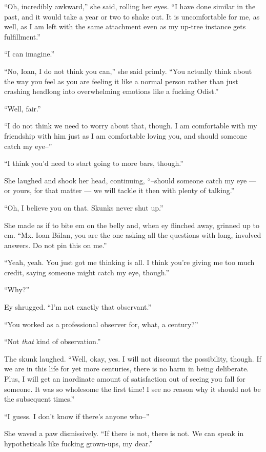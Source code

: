 ``Oh, incredibly awkward,'' she said, rolling her eyes. ``I have done similar in the past, and it would take a year or two to shake out. It is uncomfortable for me, as well, as I am left with the same attachment even as my up-tree instance gets fulfillment.''

``I can imagine.''

``No, Ioan, I do not think you can,'' she said primly. ``You actually think about the way you feel as you are feeling it like a normal person rather than just crashing headlong into overwhelming emotions like a fucking Odist.''

``Well, fair.''

``I do not think we need to worry about that, though. I am comfortable with my friendship with him just as I am comfortable loving you, and should someone catch my eye--''

``I think you'd need to start going to more bars, though.''

She laughed and shook her head, continuing, ``--should someone catch my eye — or yours, for that matter — we will tackle it then with plenty of talking.''

``Oh, I believe you on that. Skunks never shut up.''

She made as if to bite em on the belly and, when ey flinched away, grinned up to em. ``Mx. Ioan Bălan, you are the one asking all the questions with long, involved answers. Do not pin this on me.''

``Yeah, yeah. You just got me thinking is all. I think you're giving me too much credit, saying someone might catch my eye, though.''

``Why?''

Ey shrugged. ``I'm not exactly that observant.''

``You worked as a professional observer for, what, a century?''

``Not \emph{that} kind of observation.''

The skunk laughed. ``Well, okay, yes. I will not discount the possibility, though. If we are in this life for yet more centuries, there is no harm in being deliberate. Plus, I will get an inordinate amount of satisfaction out of seeing you fall for someone. It was so wholesome the first time! I see no reason why it should not be the subsequent times.''

``I guess. I don't know if there's anyone who--''

She waved a paw dismissively. ``If there is not, there is not. We can speak in hypotheticals like fucking grown-ups, my dear.''

